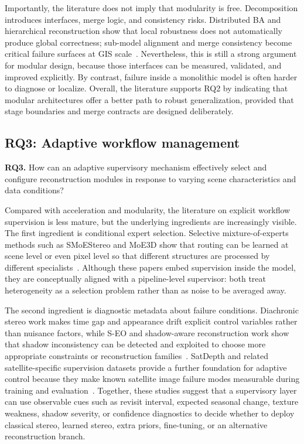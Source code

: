 Importantly, the literature does not imply that modularity is free. Decomposition introduces interfaces, merge logic, and consistency risks. Distributed BA and hierarchical reconstruction show that local robustness does not automatically produce global correctness; sub-model alignment and merge consistency become critical failure surfaces at GIS scale~\cite{Zheng2023,Li2025BALM,Zhou2026}. Nevertheless, this is still a strong argument for modular design, because those interfaces can be measured, validated, and improved explicitly. By contrast, failure inside a monolithic model is often harder to diagnose or localize. Overall, the literature supports RQ2 by indicating that modular architectures offer a better path to robust generalization, provided that stage boundaries and merge contracts are designed deliberately.

\subsection{RQ3: Adaptive workflow management}

\textbf{RQ3.} How can an adaptive supervisory mechanism effectively select and configure reconstruction modules in response to varying scene characteristics and data conditions?

Compared with acceleration and modularity, the literature on explicit workflow supervision is less mature, but the underlying ingredients are increasingly visible. The first ingredient is conditional expert selection. Selective mixture-of-experts methods such as SMoEStereo and MoE3D show that routing can be learned at scene level or even pixel level so that different structures are processed by different specialists~\cite{SMoEStereo2025,MoE3D2026}. Although these papers embed supervision inside the model, they are conceptually aligned with a pipeline-level supervisor: both treat heterogeneity as a selection problem rather than as noise to be averaged away.

The second ingredient is diagnostic metadata about failure conditions. Diachronic stereo work makes time gap and appearance drift explicit control variables rather than nuisance factors, while S-EO and shadow-aware reconstruction work show that shadow inconsistency can be detected and exploited to choose more appropriate constraints or reconstruction families~\cite{Masquil2026,SEO2025,ShadowGS2026}. SatDepth and related satellite-specific supervision datasets provide a further foundation for adaptive control because they make known satellite image failure modes measurable during training and evaluation~\cite{SatDepth2025}. Together, these studies suggest that a supervisory layer can use observable cues such as revisit interval, expected seasonal change, texture weakness, shadow severity, or confidence diagnostics to decide whether to deploy classical stereo, learned stereo, extra priors, fine-tuning, or an alternative reconstruction branch.

